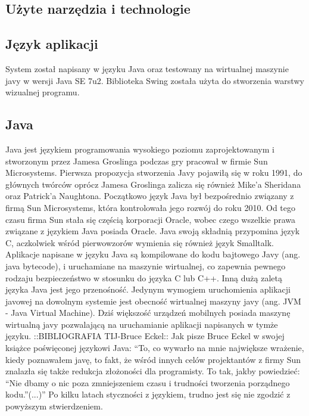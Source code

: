 \subsection{Użyte narzędzia i technologie}
\begin{par}
	\subsection{Język aplikacji}
	System został napisany w języku Java oraz testowany na wirtualnej maszynie javy w wersji Java SE 7u2. Biblioteka Swing została użyta do stworzenia warstwy wizualnej programu.
	\subsection{Java}
	Java jest językiem programowania wysokiego poziomu zaprojektowanym i stworzonym przez Jamesa Groslinga podczas gry pracował w firmie Sun Microsystems. Pierwsza propozycja stworzenia Javy pojawiłą się w roku 1991, do głównych twórców oprócz Jamesa Groslinga zalicza się również Mike'a Sheridana oraz Patrick'a Naughtona.
	Początkowo język Java był bezpośrednio związany z firmą Sun Microsystems, która kontrolowała jego rozwój do roku 2010.
	Od tego czasu firma Sun stała się częścią korporacji Oracle, wobec czego wszelkie prawa związane z językiem Java posiada Oracle.
	Java swoją składnią przypomina język C, aczkolwiek wśród pierwowzorów wymienia się również język Smalltalk.
	Aplikacje napisane w języku Java są kompilowane do kodu bajtowego Javy (ang. java bytecode), i uruchamiane na maszynie wirtualnej, co zapewnia pewnego rodzaju bezpieczeństwo w stosunku do języka C lub C++.
	Inną dużą zaletą języka Java jest jego przenośność.
	Jedynym wymogiem uruchomienia aplikacji javowej na dowolnym systemie jest obecność wirtualnej maszyny javy (ang. JVM - Java Virtual Machine).
	Dziś większość urządzeń mobilnych posiada maszynę wirtualną javy pozwalającą na uruchamianie aplikacji napisanych w tymże języku.
	::BIBLIOGRAFIA TIJ-Bruce Eckel::
	Jak pisze Bruce Eckel w swojej książce poświęconej językowi Java: ``To, co wywarło na mnie największe wrażenie, kiedy poznawałem javę, to fakt, że wśród innych celów projektantów z firmy Sun znalazła się także redukcja złożoności dla programisty. 
	To tak, jakby powiedzieć: ``Nie dbamy o nic poza zmniejszeniem czasu i trudności tworzenia porządnego kodu.''(...)''
	Po kilku latach styczności z językiem, trudno jest się nie zgodzić z powyższym stwierdzeniem.

\end{par}
